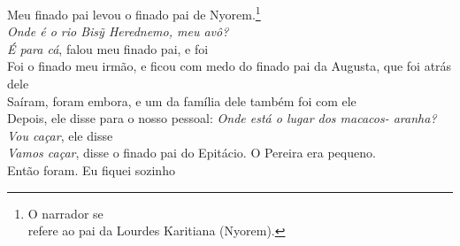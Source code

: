 \smallskip
 \begin{center}\end{center}
 \smallskip
 
\noindent   Meu finado pai levou o finado pai de Nyorem.\footnote{O narrador se\\
   refere ao pai da Lourdes Karitiana (Nyorem).}\\
  \textit{Onde é o rio \textit{Bisỹ Herednemo}, meu avô?}\\
  \textit{É para cá}, falou meu finado pai, e foi\\
  Foi o finado meu irmão, e ficou com medo do finado pai da Augusta, que foi atrás dele\\
  Saíram, foram embora, e um da família dele também foi com ele\\
  Depois, ele disse para o nosso pessoal: \textit{Onde está o lugar dos macacos- aranha?}\\
  \textit{Vou caçar}, ele disse\\
  \textit{Vamos caçar}, disse o finado pai do Epitácio. O Pereira era pequeno.\\
  Então foram. Eu fiquei sozinho
 
 \smallskip
 \begin{center}\end{center}
 \smallskip
 
